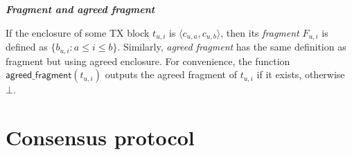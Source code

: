 
\begin{definition}
\textbf{\emph{Fragment and agreed fragment}}

If the enclosure of some TX block $t_{u, i}$ is $\langle c_{u,a}, c_{u, b} \rangle$,
then its \emph{fragment} $F_{u, i}$ is defined as $\{ b_{u, i} : a \le i \le b \}$.
Similarly, \emph{agreed fragment} has the same definition as fragment but using agreed enclosure.
For convenience, the function $\textsf{agreed\_fragment}(t_{u, i})$ outputs the agreed fragment of $t_{u, i}$ if it exists, otherwise $\bot$.
\end{definition}


\section{Consensus protocol}
\label{sec:cons-protocol}

